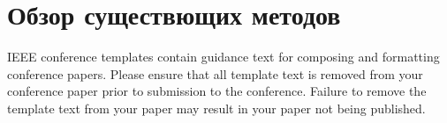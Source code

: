 \documentclass[conference]{IEEEtran}
\begin{document}
\section{Обзор существющих методов}

 
 


\vspace{12pt}
\color{red}
IEEE conference templates contain guidance text for composing and formatting conference papers. Please ensure that all template text is removed from your conference paper prior to submission to the conference. Failure to remove the template text from your paper may result in your paper not being published.
\end{document}
